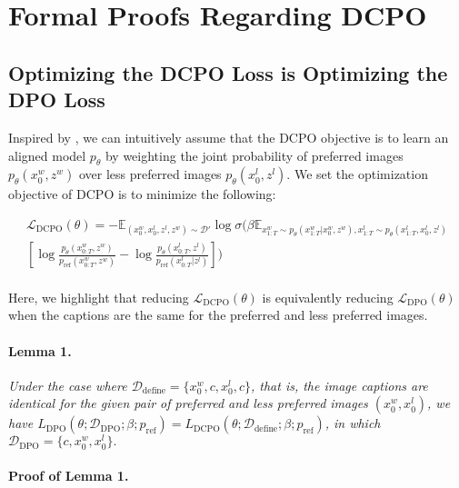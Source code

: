 \section{Formal Proofs Regarding DCPO}
\label{sec:appendix_proof_dcpo}

\subsection{Optimizing the DCPO Loss is Optimizing the DPO Loss}
Inspired by \citet{bansal2024comparing},  we can intuitively assume that the DCPO objective is to learn an aligned model $p_\theta$ by weighting the joint probability of preferred images $p_\theta(x^w_0, z^w)$ over less preferred images $p_\theta(x^l_0, z^l)$. We set the optimization objective of DCPO is to minimize the following:

\begin{equation}
\begin{split}
    \mathcal{L}_{\text{DCPO}}(\theta) = -\mathit{\mathbb{E}}_{(x^{w}_0, x^{l}_0, z^l, z^w) \sim \mathcal{D'}} \log \sigma( 
    \beta \mathit{\mathbb{E}}_{x^{w}_{1:T}\sim p_\theta(x^{w}_{1:T}|x^{w}_0, z^w),x^{l}_{1:T} \sim p_\theta (x^{l}_{1:T}, x^{l}_0,z^l)} \\
    [\log \frac{p_{\theta} (x^{w}_{0:T},z^w)}{p_{\text{ref}}(x^{w}_{0:T},z^w)} - \log \frac{p_\theta (x^{l}_{0:T},z^l)}{p_{\text{ref}}(x^{l}_{0:T}|z^l)}])
\label{dcpo_loss}
\end{split}
\end{equation}
\\
Here, we highlight that reducing $\mathcal{L}_{\text{DCPO}}(\theta)$ is equivalently reducing $\mathcal{L}_{\text{DPO}}(\theta)$ when the captions are the same for the preferred and less preferred images.

\paragraph{Lemma 1.} \textit{Under the case where $\mathcal{D}_{\text{define}}=\{x^w_0, c, x^l_0, c\}$, that is, the image captions are identical for the given pair of preferred and less preferred images $(x^w_0, x^l_0)$, we have $L_{\text{DPO}}(\theta; \mathcal{D}_{\text{DPO}}; \beta; p_{\text{ref}}) = L_{\text{DCPO}}(\theta; \mathcal{D}_{\text{define}}; \beta; p_{\text{ref}})$, in which $\mathcal{D}_{\text{DPO}}=\{c, x^w_0, x^l_0\}.$}

\paragraph{\textbf{Proof of Lemma 1.}}


